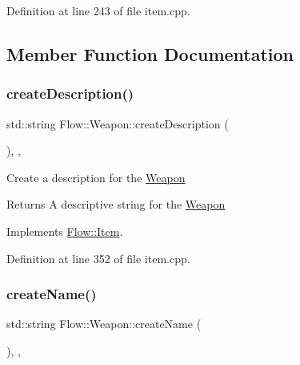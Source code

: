 Definition at line 243 of file item.\+cpp.



\subsection{Member Function Documentation}
\hypertarget{class_flow_1_1_weapon_a42cc691551e85def9133007c95b2b472}{}\label{class_flow_1_1_weapon_a42cc691551e85def9133007c95b2b472} 
\subsubsection{\texorpdfstring{create\+Description()}{createDescription()}}
{\footnotesize\ttfamily std\+::string Flow\+::\+Weapon\+::create\+Description (\begin{DoxyParamCaption}{ }\end{DoxyParamCaption})\hspace{0.3cm}{\ttfamily [override]}, {\ttfamily [protected]}, {\ttfamily [virtual]}}

Create a description for the \hyperlink{class_flow_1_1_weapon}{Weapon} \begin{DoxyReturn}{Returns}
A descriptive string for the \hyperlink{class_flow_1_1_weapon}{Weapon} 
\end{DoxyReturn}


Implements \hyperlink{class_flow_1_1_item_abf20647ff13aa4c761828d2d5508c504}{Flow\+::\+Item}.



Definition at line 352 of file item.\+cpp.

\hypertarget{class_flow_1_1_weapon_af8b4a298527dfc4e5c16d5ea2136841f}{}\label{class_flow_1_1_weapon_af8b4a298527dfc4e5c16d5ea2136841f} 
\subsubsection{\texorpdfstring{create\+Name()}{createName()}\hspace{0.1cm}{\footnotesize\ttfamily [1/2]}}
{\footnotesize\ttfamily std\+::string Flow\+::\+Weapon\+::create\+Name (\begin{DoxyParamCaption}{ }\end{DoxyParamCaption})\hspace{0.3cm}{\ttfamily [override]}, {\ttfamily [protected]}, {\ttfamily [virtual]}}

